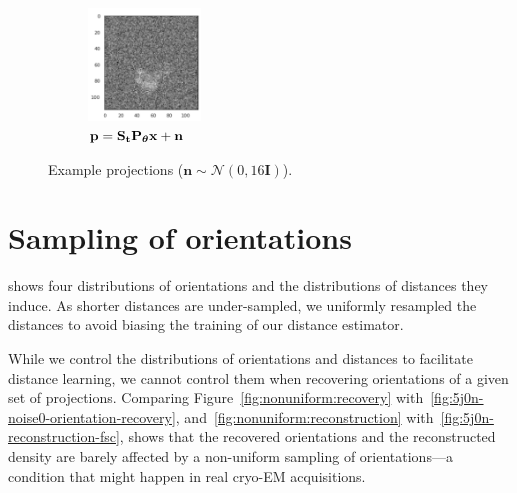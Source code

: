 \begin{figure}[ht!]
\begin{minipage}[b]{0.50\linewidth}
\begin{subfigure}[b]{0.49\linewidth}
            \includegraphics[height=3cm]{figures/5j0n_noise16_translated}
            \caption{$\mathbf{p} = \mathbf{S}_{\mathbf{t}} \mathbf{P}_{{\boldsymbol{\theta}}} \mathbf{x} + \mathbf{n}$}
        \end{subfigure}
        \caption{%
            Example projections ($\mathbf{n} \sim \mathcal{N}(0, 16\mathbf{I})$).
        }\label{fig:different-projections}
    \end{minipage}
\end{figure}

\section{Sampling of orientations}\label{apx:orientation-sampling}


 shows four distributions of orientations and the distributions of distances they induce.
As shorter distances are under-sampled, we uniformly resampled the distances to avoid biasing the training of our distance estimator.

While we control the distributions of orientations and distances to facilitate distance learning, we cannot control them when recovering orientations of a given set of projections.
Comparing Figure~\ref{fig:nonuniform:recovery} with~\ref{fig:5j0n-noise0-orientation-recovery}, and~\ref{fig:nonuniform:reconstruction} with~\ref{fig:5j0n-reconstruction-fsc}, shows that the recovered orientations and the reconstructed density are barely affected by a non-uniform sampling of orientations---a condition that might happen in real cryo-EM acquisitions.


